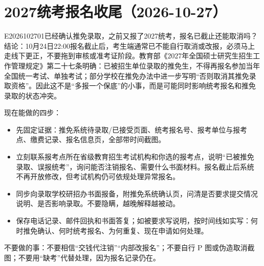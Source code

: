 \section{2027统考报名收尾（2026-10-27）}
\begin{qa}{E2026102701}{已经确认推免录取，之前又报了2027统考，报名已截止还能取消吗？}
结论：10月24日22:00报名截止后，考生端通常已不能自行取消或改报，必须马上走线下更正，不要拖到审核或准考证阶段。教育部《2027年全国硕士研究生招生工作管理规定》第二十七条明确：已被招生单位录取的推免生，不得再报名参加当年全国统一考试、单独考试；部分学校在推免办法中进一步写明“否则取消其推免录取资格”。因此这不是“多报一个保底”的小事，而是可能同时影响统考报名和推免录取的状态冲突。

现在能做的四步：
\begin{itemize}
  \item 先固定证据：推免系统待录取/已接受页面、统考报名号、报考单位与报考点、缴费记录、报名信息页，全部带时间截图。
  \item 立刻联系报考点所在省级教育招生考试机构和你选的报考点，说明“已被推免录取、误报统考”，询问能否注销报名、需要什么书面材料。报名截止后系统不再开放修改，但考试机构仍可依规处理异常报名。
  \item 同步向录取学校研招办书面报备，附推免系统确认页，问清是否要求提交情况说明、是否影响录取。不要隐瞒，越晚解释越被动。
  \item 保存电话记录、邮件回执和书面答复；如被要求写说明，按时间线如实写：何时推免确认、何时统考报名、为何重复、现在申请如何处理。
\end{itemize}

不要做的事：不要相信“交钱代注销”“内部改报名”；不要自行 P 图或伪造取消截图；不要用“缺考”代替处理，因为报名记录仍在。
\end{qa}


